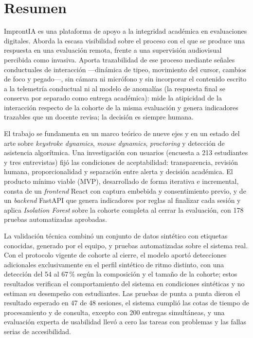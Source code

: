 \chapter*{Resumen}

ImprontIA es una plataforma de apoyo a la integridad académica en evaluaciones digitales. Aborda la escasa visibilidad sobre el proceso con el que se produce una respuesta en una evaluación remota, frente a una supervisión audiovisual percibida como invasiva. Aporta trazabilidad de ese proceso mediante señales conductuales de interacción ---dinámica de tipeo, movimiento del cursor, cambios de foco y pegado---, sin cámara ni micrófono y sin incorporar el contenido escrito a la telemetría conductual ni al modelo de anomalías (la respuesta final se conserva por separado como entrega académica): mide la atipicidad de la interacción respecto de la cohorte de la misma evaluación y genera indicadores trazables que un docente revisa; la decisión es siempre humana.

El trabajo se fundamenta en un marco teórico de nueve ejes y en un estado del arte sobre \textit{keystroke dynamics}, \textit{mouse dynamics}, \textit{proctoring} y detección de asistencia algorítmica. Una investigación con usuarios (encuesta a 213 estudiantes y tres entrevistas) fijó las condiciones de aceptabilidad: transparencia, revisión humana, proporcionalidad y separación entre alerta y decisión académica. El producto mínimo viable (MVP), desarrollado de forma iterativa e incremental, consta de un \textit{frontend} React con captura embebida y consentimiento previo, y de un \textit{backend} FastAPI que genera indicadores por reglas al finalizar cada sesión y aplica \textit{Isolation Forest} sobre la cohorte completa al cerrar la evaluación, con 178 pruebas automatizadas aprobadas.

La validación técnica combinó un conjunto de datos sintético con etiquetas conocidas, generado por el equipo, y pruebas automatizadas sobre el sistema real. Con el protocolo vigente de cohorte al cierre, el modelo aportó detecciones adicionales exclusivamente en el perfil sintético de ritmo distinto, con una detección del 54 al 67\,\% según la composición y el tamaño de la cohorte; estos resultados verifican el comportamiento del sistema en condiciones sintéticas y no estiman su desempeño con estudiantes. Las pruebas de punta a punta dieron el resultado esperado en 47 de 48 sesiones, el sistema cumplió las cotas de tiempo de procesamiento y de consulta, excepto con 200 entregas simultáneas, y una evaluación experta de usabilidad llevó a cero las tareas con problemas y las fallas serias de accesibilidad.

